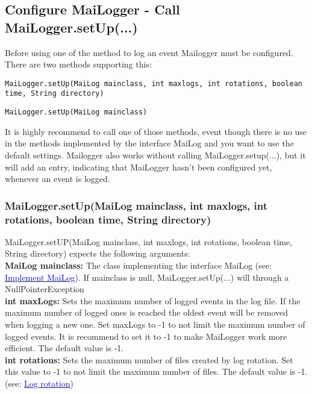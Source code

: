 \documentclass{article}
\newcommand{\refh}[2]{\hyperref[#1] {\textcolor{blue}{#2}}}
\begin{document}
    \subsection{Configure MaiLogger - Call MaiLogger.setUp(...)}
    \label{setup_mailogger.setup}
    Before using one of the method to log an event Mailogger must be configured.
    There are two methods supporting this:
    \begin{description}
        \item \lstinline|MaiLogger.setUp(MaiLog mainclass, int maxlogs, int rotations, boolean time, String directory)|
        \item \lstinline|MaiLogger.setUp(MaiLog mainclass)|
    \end{description}

    It is highly recommend to call one of those methods, event though there is no use in the methods implemented by the interface MaiLog and you want to use the default settings.
    Mailogger also works without calling MaiLogger.setup(...), but it will add an entry, indicating that MaiLogger hasn't been configured yet, whenever an event is logged.

    \subsubsection{MaiLogger.setUp(MaiLog mainclass, int maxlogs, int rotations, boolean time, String directory)}
    \label{setup_mailogger.setup_1}
    MaiLogger.setUP(MaiLog mainclass, int maxlogs, int rotations, boolean time, String directory) expects the following arguments: \\

    \textbf{MaiLog mainclass:}
    The class implementing the interface MaiLog (see: \refh{setup_interface}{Implement MaiLog}).
    If mainclass is null, MaiLogger.setUp(...) will through a NullPointerException \\

    \textbf{int maxLogs:}
    Sets the maximum number of logged events in the log file.
    If the maximum number of logged ones is reached the oldest event will be removed when logging a new one.
    Set maxLogs to -1 to not limit the maximum number of logged events.
    It is recommend to set it to -1 to make MaiLogger work more efficient.
    The default value is -1. \\

    \textbf{int rotations:}
    Sets the maximum number of files created by log rotation.
    Set this value to -1 to not limit the maximum number of files.
    The default value is -1. (see: \refh{rotate}{Log rotation}) \\
\end{document}
